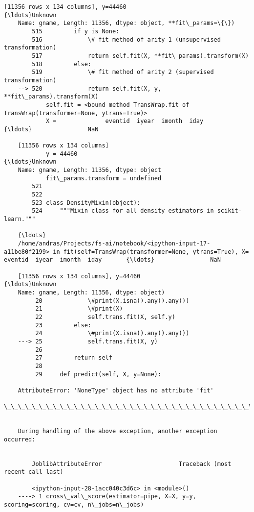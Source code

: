 \documentclass[11pt]{article}
\begin{document}
\begin{Verbatim}[commandchars=\\\{\}]
    [11356 rows x 134 columns], y=44460                                           {\ldots}Unknown
    Name: gname, Length: 11356, dtype: object, **fit\_params=\{\})
        515         if y is None:
        516             \# fit method of arity 1 (unsupervised transformation)
        517             return self.fit(X, **fit\_params).transform(X)
        518         else:
        519             \# fit method of arity 2 (supervised transformation)
    --> 520             return self.fit(X, y, **fit\_params).transform(X)
            self.fit = <bound method TransWrap.fit of TransWrap(transformer=None, ytrans=True)>
            X =              eventid  iyear  imonth  iday       {\ldots}                NaN  
    
    [11356 rows x 134 columns]
            y = 44460                                           {\ldots}Unknown
    Name: gname, Length: 11356, dtype: object
            fit\_params.transform = undefined
        521 
        522 
        523 class DensityMixin(object):
        524     """Mixin class for all density estimators in scikit-learn."""
    
    {\ldots}
    /home/andras/Projects/fs-ai/notebook/<ipython-input-17-a11be80f2199> in fit(self=TransWrap(transformer=None, ytrans=True), X=             eventid  iyear  imonth  iday       {\ldots}                NaN  
    
    [11356 rows x 134 columns], y=44460                                           {\ldots}Unknown
    Name: gname, Length: 11356, dtype: object)
         20             \#print(X.isna().any().any())
         21             \#print(X)
         22             self.trans.fit(X, self.y)
         23         else:
         24             \#print(X.isna().any().any())
    ---> 25             self.trans.fit(X, y)
         26         
         27         return self
         28 
         29     def predict(self, X, y=None):
    
    AttributeError: 'NoneType' object has no attribute 'fit'
    \_\_\_\_\_\_\_\_\_\_\_\_\_\_\_\_\_\_\_\_\_\_\_\_\_\_\_\_\_\_\_\_\_\_\_\_\_\_\_\_\_\_\_\_\_\_\_\_\_\_\_\_\_\_\_\_\_\_\_\_\_\_\_\_\_\_\_\_\_\_\_\_\_\_\_

        
    During handling of the above exception, another exception occurred:


        JoblibAttributeError                      Traceback (most recent call last)

        <ipython-input-28-1acc040c3d6c> in <module>()
    ----> 1 cross\_val\_score(estimator=pipe, X=X, y=y, scoring=scoring, cv=cv, n\_jobs=n\_jobs)
    


\end{Verbatim}
\end{document}
